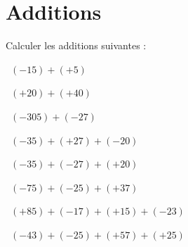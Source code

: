 
\section{Additions}

Calculer les additions suivantes :
\begin{questions}
	
	\question[1]  $(-15) + (+ 5)$
	\fillwithdottedlines{1cm}
	\begin{solution}
		
	\end{solution}
	
	\question[1]  $(+20) + (+ 40)$
	\fillwithdottedlines{1cm}
	\begin{solution}
		
	\end{solution}
	
	
	
	
	\question[1]  $(-305) + (-27)$
	\fillwithdottedlines{1cm}
	\begin{solution}
		
	\end{solution}
	
	
	\question[1]  $(-35) + (+27)  + (-20)$
	\fillwithdottedlines{1.5cm}
	\begin{solution}
		
	\end{solution}
	
	
	\question[2]  $(-35) + (-27)  + (+20)$
	\fillwithdottedlines{1.5cm}
	\begin{solution}
		
	\end{solution}
	
	
	
	
	\question[2]  $(-75) + (-25) + (+37)$
	\fillwithdottedlines{1.5cm}
	\begin{solution}
		
	\end{solution}
	
	
	\question[2]  $(+85) + (-17) + (+15) + (-23)$ 
	\fillwithdottedlines{2cm}
	\begin{solution}
		
	\end{solution}
	
	
	\question[2]  $(-43) + (-25) + (+57) + (+25)$ 
	\fillwithdottedlines{2cm}
	\begin{solution}
		
	\end{solution}
\end{questions}

